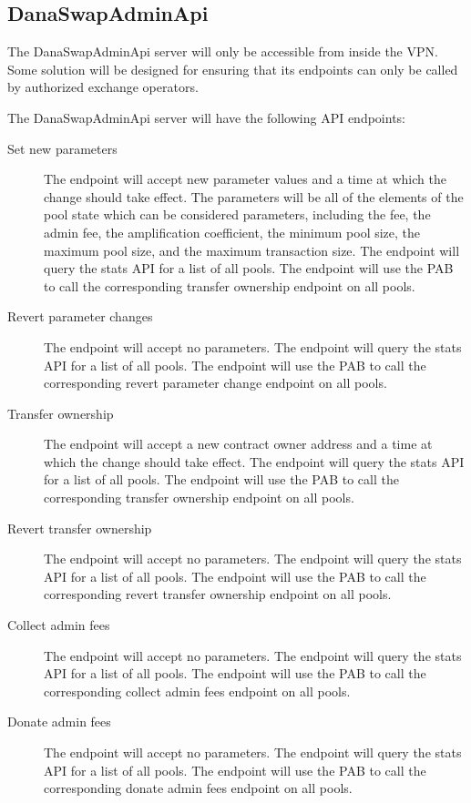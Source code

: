 \documentclass[12pt]{article}
\begin{document}
\subsection{DanaSwapAdminApi}

The DanaSwapAdminApi server will only be accessible from inside the VPN. Some solution will be designed for ensuring that its endpoints can only be called by authorized exchange operators.

The DanaSwapAdminApi server will have the following API endpoints:

\begin{description}
	\item[Set new parameters] The endpoint will accept new parameter values and a time at which the change should take effect. The parameters will be all of the elements of the pool state which can be considered parameters, including the fee, the admin fee, the amplification coefficient, the minimum pool size, the maximum pool size, and the maximum transaction size. The endpoint will query the stats API for a list of all pools. The endpoint will use the PAB to call the corresponding transfer ownership endpoint on all pools.
	\item[Revert parameter changes] The endpoint will accept no parameters. The endpoint will query the stats API for a list of all pools. The endpoint will use the PAB to call the corresponding revert parameter change endpoint on all pools.
	\item[Transfer ownership] The endpoint will accept a new contract owner address and a time at which the change should take effect. The endpoint will query the stats API for a list of all pools. The endpoint will use the PAB to call the corresponding transfer ownership endpoint on all pools.
	\item[Revert transfer ownership] The endpoint will accept no parameters. The endpoint will query the stats API for a list of all pools. The endpoint will use the PAB to call the corresponding revert transfer ownership endpoint on all pools.
	\item[Collect admin fees] The endpoint will accept no parameters. The endpoint will query the stats API for a list of all pools. The endpoint will use the PAB to call the corresponding collect admin fees endpoint on all pools.
	\item[Donate admin fees] The endpoint will accept no parameters. The endpoint will query the stats API for a list of all pools. The endpoint will use the PAB to call the corresponding donate admin fees endpoint on all pools.

\end{description}
\end{document}
